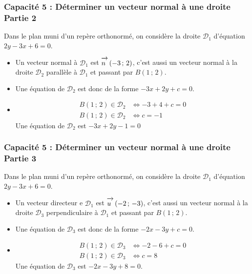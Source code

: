 \documentclass[11pt, hyperref={urlcolor=red,%
            linkcolor=blue, %
            colorlinks=true}]{beamer}
\newcommand{\Coord}[2]{\left(#1\, ;\, #2\right)}
\newcommand{\vect}[1]{\mathchoice%
{\overrightarrow{\displaystyle\mathstrut#1\,\,}}%
{\overrightarrow{\textstyle\mathstrut#1\,\,}}%
{\overrightarrow{\scriptstyle\mathstrut#1\,\,}}%
{\overrightarrow{\scriptscriptstyle\mathstrut#1\,\,}}}
\begin{document}
\begin{frame}
\frametitle{Capacité 5 : Déterminer un vecteur normal à une droite Partie 2}

Dans le plan muni d'un repère orthonormé, on considère la droite $\mathcal{D}_{1}$ d'équation $2y-3x+6=0$.

\begin{itemize}
\pause \item Un vecteur normal à $\mathcal{D}_{1}$ est $\vect{n}\Coord{-3}{2}$, c'est aussi un vecteur normal à la droite $\mathcal{D}_{2}$  parallèle à $\mathcal{D}_{1}$ et passant par $B\Coord{1}{2}$.  
\pause \item Une équation de $\mathcal{D}_{2}$ est donc de la forme $-3x+2y+c=0$. 
\pause \item   
\begin{align*}
B\Coord{1}{2}\in \mathcal{D}_{2} &\Leftrightarrow -3+4+c=0 \\
B\Coord{1}{2}\in \mathcal{D}_{2} &\Leftrightarrow c=-1
\end{align*}
Une équation de $\mathcal{D}_{2}$  est $-3x+2y-1=0$
\end{itemize}
\end{frame}



\begin{frame}
\frametitle{Capacité 5 : Déterminer un vecteur normal à une droite Partie 3}

Dans le plan muni d'un repère orthonormé, on considère la droite $\mathcal{D}_{1}$ d'équation $2y-3x+6=0$.

\begin{itemize}
\pause \item Un vecteur directeur e $\mathcal{D}_{1}$ est $\vect{u}\Coord{-2}{-3}$, c'est aussi un vecteur normal à la droite $\mathcal{D}_{3}$  perpendiculaire à $\mathcal{D}_{1}$ et passant par $B\Coord{1}{2}$.  
\pause \item Une équation de $\mathcal{D}_{3}$ est donc de la forme $-2x-3y+c=0$. 
\pause \item   
\begin{align*}
B\Coord{1}{2}\in \mathcal{D}_{3} &\Leftrightarrow -2-6+c=0\\
B\Coord{1}{2}\in \mathcal{D}_{3} &\Leftrightarrow c=8
\end{align*}
Une équation de $\mathcal{D}_{3}$  est $-2x-3y+8=0$.
\end{itemize}
\end{frame}
\end{document}
